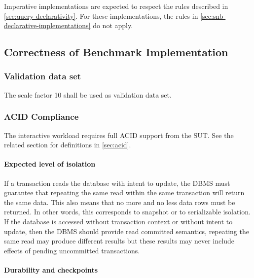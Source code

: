 Imperative implementations are expected to respect the rules described in \autoref{sec:query-declarativity}. For these implementations, the rules in \autoref{sec:snb-declarative-implementations} do not apply.

\subsection{Correctness of Benchmark Implementation}

\subsubsection{Validation data set}
\label{sec:validation-data-set}
The scale factor 10 shall be used as validation data set.

\subsubsection{ACID Compliance}
\label{sec:snb-acid}

The interactive workload requires full ACID support from the SUT.
See the related section for definitions in \autoref{sec:acid}.

\paragraph{Expected level of isolation}
If a transaction reads the database with intent to update, the DBMS must guarantee that repeating the same read within the same transaction will return the same data. This also means that no more and no less data rows must be returned. In other words, this corresponds to snapshot or to serializable isolation. If the database is accessed without transaction context or without intent to update, then the DBMS should provide read committed semantics, \eg repeating the same read may produce different results but these results may never include effects of pending uncommitted transactions.


\paragraph{Durability and checkpoints}

